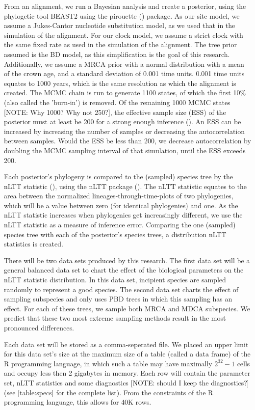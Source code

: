 \documentclass{article}
\begin{document}
From an alignment, we run a Bayesian analysis and create a posterior, 
using the phylogetic tool BEAST2 \cite{beast2} using the 
pirouette (\cite{pirouette}) package. As our site model, we assume a Jukes-Cantor 
nucleotide substitution model, as we used that in the simulation of the alignment.
For our clock model, we assume a strict clock with the same fixed rate as 
used in the simulation of the alignment. The tree prior assumed is the BD model, 
as this simplification is the goal of this research. 
Additionally, we assume a MRCA prior with a normal distribution
with a mean of the crown age, and a standard deviation of 0.001 time units. 0.001
time units equates to 1000 years, which is the same resolution as which the
alignment is created. The MCMC chain is run to generate 1100 states,
of which the first 10\% (also called the 'burn-in') is removed. Of the remaining
1000 MCMC states [NOTE: Why 1000? Why not 250?], 
the effective sample size (ESS) of the posterior must at least be 200
for a strong enough inference (\cite{beastbook}). An ESS can be increased by increasing
the number of samples or decreasing the autocorrelation between samples. 
Would the ESS be less than 200, we decrease autocorrelation by doubling 
the MCMC sampling interval of that simulation, until the ESS exceeds 200.

Each posterior's phylogeny is compared to the (sampled) species tree
by the nLTT statistic (\cite{janzen2015}), using the nLTT package (\cite{nltt}). 
The nLTT statistic equates to the area between the normalized
lineages-through-time-plots of two phylogenies, which will be a value between 
zero (for identical phylogenies) and one. As the nLTT statistic increases
when phylogenies get increasingly different, we use the nLTT statistic
as a measure of inference error. Comparing the one (sampled) species tree
with each of the posterior's species trees, a distribution nLTT statistics
is created. 

There will be two data sets produced by this research.
The first data set will be a general balanced data set to chart
the effect of the biological parameters on the nLTT statistic
distribution. In this data set, incipient species are sampled 
randomly to represent a good species.
The second data set charts the effect of sampling
subspecies and only uses PBD trees in which this sampling
has an effect. For each of these trees, we sample both MRCA and
MDCA subspecies. We predict that these two most extreme sampling methods
result in the most pronounced differences.

Each data set will be stored as a comma-seperated file. We placed 
an upper limit for this data set's size at the maximum size of a table (called 
a data frame) of the R programming language, in which such a table may 
have maximally $2^{32}-1$ cells and occupy less then 2 gigabytes in memory.
Each row will contain the parameter set, nLTT statistics and some 
diagnostics [NOTE: should I keep the diagnostics?] (see \ref{table:specs} for the 
complete list). From the constraints of the R programming language, this allows for 40K rows. 
\end{document}
